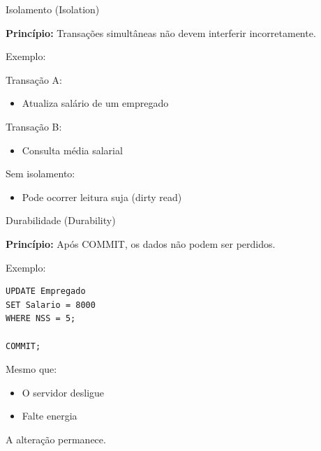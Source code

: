\documentclass{beamer}
\begin{document}
\begin{frame}{Isolamento (Isolation)}

\textbf{Princípio:}
Transações simultâneas não devem interferir incorretamente.

Exemplo:

Transação A:
\begin{itemize}
    \item Atualiza salário de um empregado
\end{itemize}

Transação B:
\begin{itemize}
    \item Consulta média salarial
\end{itemize}

Sem isolamento:
\begin{itemize}
    \item Pode ocorrer leitura suja (dirty read)
\end{itemize}

\end{frame}

















\begin{frame}{Durabilidade (Durability)}

\textbf{Princípio:}
Após COMMIT, os dados não podem ser perdidos.

Exemplo:

\begin{verbatim}
UPDATE Empregado
SET Salario = 8000
WHERE NSS = 5;

COMMIT;
\end{verbatim}

Mesmo que:
\begin{itemize}
    \item O servidor desligue
    \item Falte energia
\end{itemize}

A alteração permanece.

\end{frame}
\end{document}
